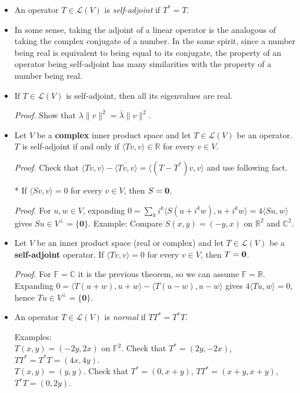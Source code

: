 \documentclass[11pt]{article}
\newcommand{\1}{\mathbf{1}}
\newcommand{\inner}[2]{\langle #1, #2 \rangle}
\newcommand{\0}{\mathbf{0}}
\newcommand{\C}{\mathbb{C}}
\newcommand{\F}{\mathbb{F}}
\newcommand{\R}{\mathbb{R}}
\begin{document}
{\begin{itemize}
\item

An operator $T\in\mathcal{L}(V)$ is \emph{self-adjoint} if $T^*=T$.

\item

In some sense, taking the adjoint of a linear operator is the analogous of taking the complex conjugate of a number.
In the same spirit, since a number being real is equivalent to being equal to its conjugate, the property of an operator being self-adjoint has many similarities with the property of a number being real.

\item

If $T\in\mathcal{L}(V)$ is self-adjoint, then all its eigenvalues are real.

\emph{Proof.}
Show that $\lambda \|v\|^2 = \bar{\lambda} \|v\|^2$.

\item

Let $V$ be a {\bf complex} inner product space and let $T\in\mathcal{L}(V)$ be an operator. $T$ is self-adjoint if and only if $\langle Tv,v\rangle\in\mathbb{R}$ for every $v\in V$.

\emph{Proof.}
Check that $\inner{Tv}{v}-\overline{\inner{Tv}{v}}=\inner{(T-T^*)v}{v}$ and use following fact.

* If $\langle Sv,v\rangle=0$ for every $v\in V$, then $S={\bf 0}$.

\emph{Proof.}
For $u, w\in V$, expanding
$0 = \sum_k i^k \inner{S(u+i^kw)}{u+i^kw} = 4 \inner{Su}{w}$ gives $Su \in V^\perp=\{\0\}$.
Example:
Compare $S(x,y)=(-y,x)$ on $\R^2$ and $\C^2$.

\item

Let $V$ be an inner product space (real or complex) and let $T\in\mathcal{L}(V)$ be a {\bf self-adjoint} operator. If $\langle Tv,v\rangle=0$ for every $v\in V$, then $T={\bf 0}$.

\emph{Proof.}
For $\F=\C$ it is the previous theorem, so we can assume $\F=\R$. Expanding
$0=\inner{T(u+w)}{u+w}-\inner{T(u-w)}{u-w}$ gives $4\inner{Tu}{w}=0$, hence $Tu \in V^\perp=\{\0\}$.

\item

An operator $T\in\mathcal{L}(V)$ is \emph{normal} if $TT^*=T^*T$.

Examples:
\\
$T(x,y)=(-2y,2x)$ on $\F^2$.
Check that $T^*=(2y,-2x)$, $TT^*=T^*T=(4x,4y)$.\\
$T(x,y)=(y,y)$.
Check that $T^*=(0,x+y)$, $TT^*=(x+y,x+y)$, $T^*T=(0,2y)$.


\end{itemize}}
\end{document}
